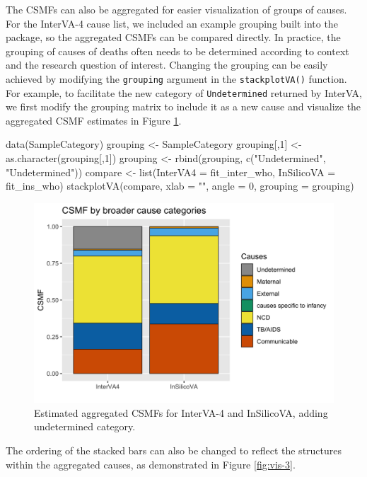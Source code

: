 The CSMFs can also be aggregated for easier visualization of groups of
causes. For the InterVA-4 cause list, we included an example grouping
built into the package, so the aggregated CSMFs can be compared
directly. In practice, the grouping of causes of deaths often needs to
be determined according to context and the research question of
interest. Changing the grouping can be easily achieved by modifying the
\texttt{grouping} argument in the \texttt{stackplotVA()} function. For
example, to facilitate the new category of \texttt{Undetermined}
returned by InterVA, we first modify the grouping matrix to include it
as a new cause and visualize the aggregated CSMF estimates in Figure
\ref{fig:vis-2}.

\begin{Schunk}
\begin{Sinput}
data(SampleCategory)
grouping <- SampleCategory
grouping[,1] <- as.character(grouping[,1])
grouping <- rbind(grouping, c("Undetermined", "Undetermined"))
compare <- list(InterVA4 = fit_inter_who,
                InSilicoVA = fit_ins_who)
stackplotVA(compare, xlab = "", angle = 0,  grouping = grouping)
\end{Sinput}
\begin{figure}[!h]

{\centering \includegraphics[width=.7\linewidth,]{openVA-RJ-R1_files/figure-latex/vis-2-1} 

}

\caption[Estimated aggregated CSMFs for InterVA-4 and InSilicoVA, adding undetermined category]{Estimated aggregated CSMFs for InterVA-4 and InSilicoVA, adding undetermined category.}\label{fig:vis-2}
\end{figure}
\end{Schunk}

The ordering of the stacked bars can also be changed to reflect the
structures within the aggregated causes, as demonstrated in Figure
\ref{fig:vis-3}.

